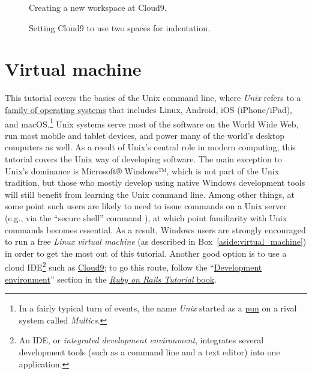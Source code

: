 \begin{figure}
\begin{center}
\end{center}
\caption{Creating a new workspace at Cloud9.\label{fig:cloud9_new_workspace}}
\end{figure}

\begin{figure}
\begin{center}
\end{center}
\caption{Setting Cloud9 to use two spaces for indentation.\label{fig:cloud9_two_spaces}}
\end{figure}

\section{Virtual machine} %
\label{sec:virtual_machine}


This tutorial covers the basics of the Unix command line, where \emph{Unix} refers to a \href{https://en.wikipedia.org/wiki/Unix}{family of operating systems} that includes Linux, Android, iOS (iPhone/iPad), and macOS\@.\footnote{In a fairly typical turn of events, the name \emph{Unix} started as a \href{http://www.catb.org/jargon/html/U/Unix.html}{pun} on a rival system called \emph{Multics}.} Unix systems serve most of the software on the World Wide Web, run most mobile and tablet devices, and power many of the world's desktop computers as well. As a result of Unix's central role in modern computing, this tutorial covers the Unix way of developing software. The main exception to Unix's dominance is Microsoft® Windows™, which is not part of the Unix tradition, but those who mostly develop using native Windows development tools will still benefit from learning the Unix command line. Among other things, at some point such users are likely to need to issue commands on a Unix server (e.g., via the ``secure shell'' command ), at which point familiarity with Unix commands becomes essential. As a result, Windows users are strongly encouraged to run a free \emph{Linux virtual machine} (as described in Box~\ref{aside:virtual_machine}) in order to get the most out of this tutorial. Another good option is to use a cloud IDE\footnote{An IDE, or \emph{integrated development environment}, integrates several development tools (such as a command line and a text editor) into one application.} such as \href{http://c9.io/}{Cloud9}; to go this route, follow the ``\href{https://www.railstutorial.org/book/beginning#sec-development_environment}{Development environment}'' section in the \href{http://railstutorial.org/book}{\emph{Ruby on Rails Tutorial} book}.

